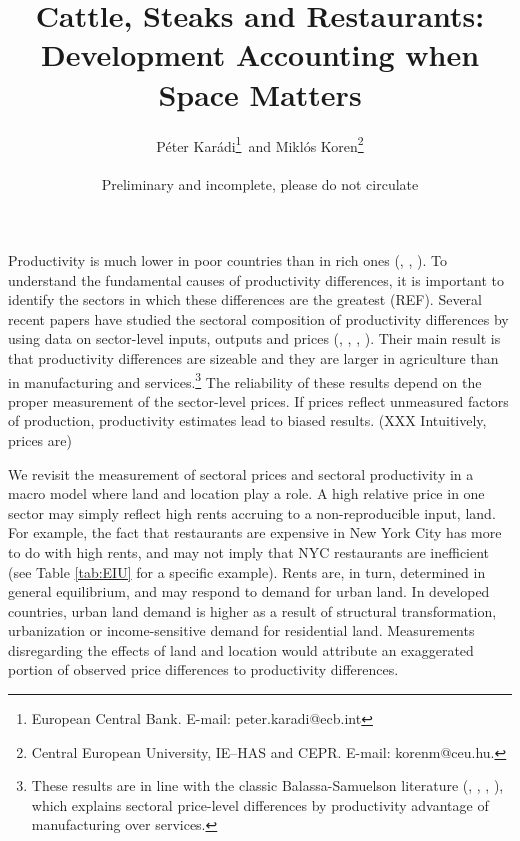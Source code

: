 \documentclass[12pt]{article}
\begin{document}
\title{Cattle, Steaks and Restaurants: Development Accounting when Space Matters}
\author{Péter Karádi\thanks{European Central Bank. E-mail: peter.karadi@ecb.int}~and Miklós Koren\thanks{Central European University, IE--HAS and CEPR. E-mail: korenm@ceu.hu.}\\ 
\\
Preliminary and incomplete, please do not circulate}
\maketitle


Productivity is much lower in poor countries than in rich ones (, , ). To understand the fundamental causes of productivity differences, it is important to identify the sectors in which these differences are the greatest (REF). Several recent papers have studied the sectoral composition of productivity differences by using data on sector-level inputs, outputs and prices (, , , ). Their main result is that productivity differences are sizeable and they are larger in agriculture than in manufacturing and services.\footnote{These results are in line with the classic Balassa-Samuelson literature (, , , ), which explains sectoral price-level differences by productivity advantage of manufacturing over services.} %
The reliability of these results depend on the proper measurement of the sector-level prices. If prices reflect unmeasured factors of production, productivity estimates lead to biased results. (XXX Intuitively, prices are)

We revisit the measurement of sectoral prices and sectoral productivity in a macro model where land and location play a role. A high relative price in one sector may simply reflect high rents accruing to a non-reproducible input, land. For example, the fact that restaurants are expensive in New York City has more to do with high rents, and may not imply that NYC restaurants are inefficient (see Table \ref{tab:EIU} for a specific example). Rents are, in turn, determined in general equilibrium, and may respond to demand for urban land. In developed countries, urban land demand is higher as a result of structural transformation, urbanization or income-sensitive demand for residential land. Measurements disregarding the effects of land and location would attribute an exaggerated portion of observed price differences to productivity differences. %
\end{document}
